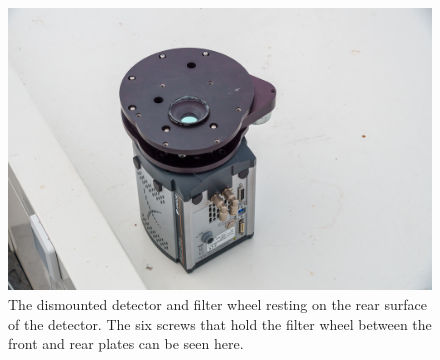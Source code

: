 \begin{figure}
\begin{center}
\includegraphics[width=0.8\linewidth]{figures/huitzi-off-telescope.jpg}
\end{center}
\caption{The dismounted detector and filter wheel resting on the rear surface of the detector. The six screws that hold the filter wheel between the front and rear plates can be seen here.}
\label{figure:huitzi-off-telescope}
\end{figure}

